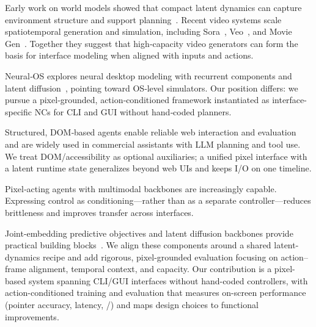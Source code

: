 Early work on world models showed that compact latent dynamics can capture environment structure and support planning~\citep{ha2018world}.
Recent video systems scale spatiotemporal generation and simulation, including Sora~\citep{openai2024sora}, Veo~\citep{deepmind_veo_2025}, and Movie Gen~\citep{polyak2024movie}.
Together they suggest that high‑capacity video generators can form the basis for interface modeling when aligned with inputs and actions.

Neural‑OS explores neural desktop modeling with recurrent components and latent diffusion~\citep{rivard2025neuralos,hochreiter1997long,rombach2022high}, pointing toward OS‑level simulators.
Our position differs: we pursue a pixel‑grounded, action‑conditioned framework instantiated as interface-specific NCs for CLI and GUI without hand‑coded planners.

Structured, DOM‑based agents enable reliable web interaction and evaluation~\citep{deng2023mind2web} and are widely used in commercial assistants with LLM planning and tool use.
We treat DOM/accessibility as optional auxiliaries; a unified pixel interface with a latent runtime state generalizes beyond web UIs and keeps I/O on one timeline.

Pixel‑acting agents with multimodal backbones are increasingly capable.
Expressing control as conditioning—rather than as a separate controller—reduces brittleness and improves transfer across interfaces.

Joint-embedding predictive objectives and latent diffusion backbones provide practical building blocks~\citep{assran2023self,rombach2022high}. We align these components around a shared latent-dynamics recipe and add rigorous, pixel-grounded evaluation focusing on action–frame alignment, temporal context, and capacity. Our contribution is a pixel-based system spanning CLI/GUI interfaces without hand-coded controllers, with action-conditioned training and evaluation that measures on-screen performance (pointer accuracy, latency, \LPIPS/\FVD) and maps design choices to functional improvements.

